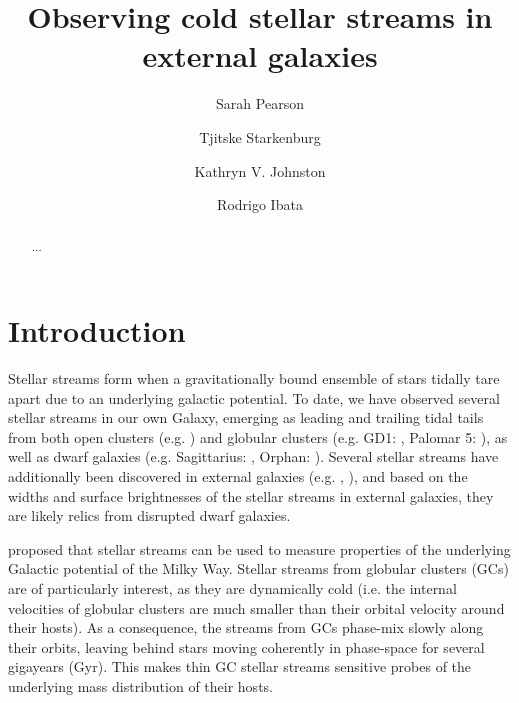 \documentclass[twocolumn]{aastex62}
\begin{document}
\sloppy\sloppypar\raggedbottom\frenchspacing %
\title{Observing cold stellar streams in external galaxies}


 \author{Sarah Pearson}

\author{Tjitske Starkenburg}

\author{Kathryn V. Johnston}

\author{Rodrigo Ibata}

\begin{abstract}\noindent %
    ...
\end{abstract}

\section{Introduction} \label{sec:intro}
Stellar streams form when a gravitationally bound ensemble of stars tidally tare apart due to an underlying galactic potential. To date, we have observed several stellar streams in our own Galaxy, emerging as leading and trailing tidal tails from both open clusters (e.g. \citealt{roser19}) and globular clusters (e.g. GD1: \citealt{grillmair06}, Palomar 5: \citealt{oden01}), as well as dwarf galaxies (e.g. Sagittarius: \citealt{ibata01}, Orphan: \citealt{belokurov06}). Several stellar streams have additionally been discovered in external galaxies (e.g. \citealt{ibata00}, \citealt{delgado10}), and based on the widths and surface brightnesses of the stellar streams in external galaxies, they are likely relics from disrupted dwarf galaxies.

\citet{johnston98} proposed that stellar streams can be used to measure properties of the underlying Galactic potential of the Milky Way. Stellar streams from globular clusters (GCs) are of particularly interest, as they are dynamically cold (i.e. the internal velocities of globular clusters are much smaller than their orbital velocity around their hosts). As a consequence,  the streams from GCs phase-mix slowly along their orbits, leaving behind stars moving coherently in phase-space for several gigayears (Gyr). This makes thin GC stellar streams sensitive probes of the underlying mass distribution of their hosts. 
\end{document}
